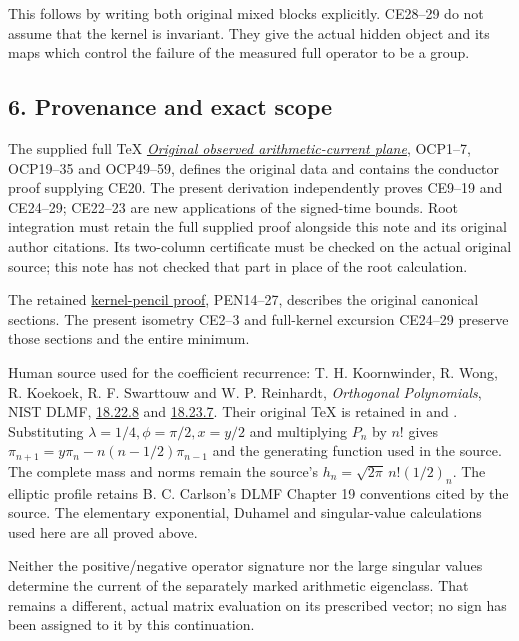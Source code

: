 \documentclass[10pt]{article}
\begin{document}
This follows by writing both original mixed blocks explicitly. CE28--29 do not assume that the kernel is invariant. They give the actual hidden object and its maps which control the failure of the measured full operator to be a group.

\subsection{6. Provenance and exact scope}\label{provenance-and-exact-scope}

The supplied full TeX \href{OBSERVED_CURRENT_PLANE.tex}{\emph{Original observed arithmetic-current plane}}, OCP1--7, OCP19--35 and OCP49--59, defines the original data and contains the conductor proof supplying CE20. The present derivation independently proves CE9--19 and CE24--29; CE22--23 are new applications of the signed-time bounds. Root integration must retain the full supplied proof alongside this note and its original author citations. Its two-column certificate must be checked on the actual original source; this note has not checked that part in place of the root calculation.

The retained \href{https://github.com/KokunoYumeto/zeta-function-research-reader/blob/9104d852c6bc5b79e6fc4588c403128a40b7fda3/workbenches/splitzero-tandem/continuations/20260922-arithmetic-probe-mass/PENCIL_PROOFS.md}{kernel-pencil proof}, PEN14--27, describes the original canonical sections. The present isometry CE2--3 and full-kernel excursion CE24--29 preserve those sections and the entire minimum.

Human source used for the coefficient recurrence: T. H. Koornwinder, R. Wong, R. Koekoek, R. F. Swarttouw and W. P. Reinhardt, \emph{Orthogonal Polynomials}, NIST DLMF, \href{https://dlmf.nist.gov/18.22.E8}{18.22.8} and \href{https://dlmf.nist.gov/18.23.E7}{18.23.7}. Their original TeX is retained in  and . Substituting \(\lambda=1/4,\phi=\pi/2,x=y/2\) and multiplying \(P_n\) by \(n!\) gives \(\pi_{n+1}=y\pi_n-n(n-1/2)\pi_{n-1}\) and the generating function used in the source. The complete mass and norms remain the source's \(h_n=\sqrt{2\pi}\,n!(1/2)_n\). The elliptic profile retains B. C. Carlson's DLMF Chapter 19 conventions cited by the source. The elementary exponential, Duhamel and singular-value calculations used here are all proved above.

Neither the positive/negative operator signature nor the large singular values determine the current of the separately marked arithmetic eigenclass. That remains a different, actual matrix evaluation on its prescribed vector; no sign has been assigned to it by this continuation.
\end{document}
